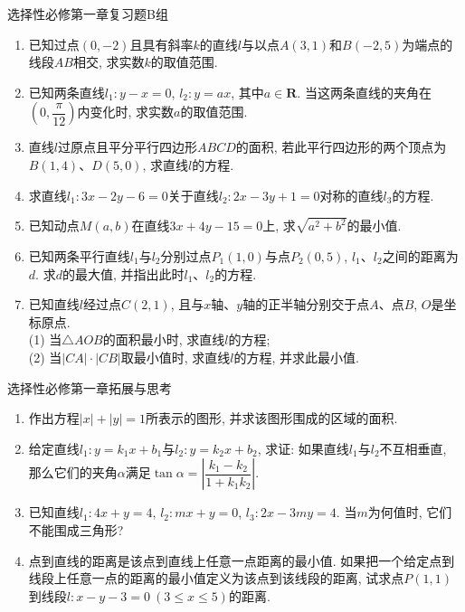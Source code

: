 \documentclass[10pt,a4paper]{article}
\begin{document}
选择性必修第一章复习题B组

\begin{enumerate}[1.]

\item 已知过点$(0, -2)$且具有斜率$k$的直线$l$与以点$A(3, 1)$和$B(-2, 5)$为端点的线段$AB$相交, 求实数$k$的取值范围.
\vspace*{3cm}
\item 已知两条直线$l_1: y-x=0$, $l_2: y=ax$, 其中$a\in \mathbf{R}$. 当这两条直线的夹角在$(0, \dfrac{\pi}{12})$内变化时, 求实数$a$的取值范围.
\vspace*{3cm}
\item 直线$l$过原点且平分平行四边形$ABCD$的面积, 若此平行四边形的两个顶点为$B(1, 4)$、$D(5, 0)$, 求直线$l$的方程.
\vspace*{3cm}
\item 求直线$l_1: 3x-2y-6=0$关于直线$l_2: 2x-3y+1=0$对称的直线$l_3$的方程.
\vspace*{3cm}
\item 已知动点$M(a, b)$在直线$3x+4y-15=0$上, 求$\sqrt{a^2+b^2}$的最小值.
\vspace*{3cm}
\item 已知两条平行直线$l_1$与$l_2$分别过点$P_1(1, 0)$与点$P_2(0, 5)$, $l_1$、$l_2$之间的距离为$d$. 求$d$的最大值, 并指出此时$l_1$、$l_2$的方程.
\vspace*{3cm}
\item 已知直线$l$经过点$C(2, 1)$, 且与$x$轴、$y$轴的正半轴分别交于点$A$、点$B$, $O$是坐标原点.\\
(1) 当$\triangle AOB$的面积最小时, 求直线$l$的方程;\\
(2) 当$|CA|\cdot |CB|$取最小值时, 求直线$l$的方程, 并求此最小值.
\vspace*{3cm}
\end{enumerate}

选择性必修第一章拓展与思考

\begin{enumerate}[1.]

\item 作出方程$|x|+|y|=1$所表示的图形, 并求该图形围成的区域的面积.
\vspace*{3cm}
\item 给定直线$l_1: y=k_1x+b_1$与$l_2: y=k_2x+b_2$, 求证: 如果直线$l_1$与$l_2$不互相垂直, 那么它们的夹角$\alpha$满足$\tan \alpha=|\dfrac{k_1-k_2}{1+k_1k_2}|$.
\vspace*{3cm}
\item 已知直线$l_1: 4x+y=4$, $l_2: mx+y=0$, $l_3: 2x-3my=4$. 当$m$为何值时, 它们不能围成三角形?
\vspace*{3cm}
\item 点到直线的距离是该点到直线上任意一点距离的最小值. 如果把一个给定点到线段上任意一点的距离的最小值定义为该点到该线段的距离, 试求点$P(1, 1)$到线段$l: x-
y-3=0 \ (3\le x\le 5)$的距离.   
\vspace*{3cm}
\end{enumerate}
\end{document}
